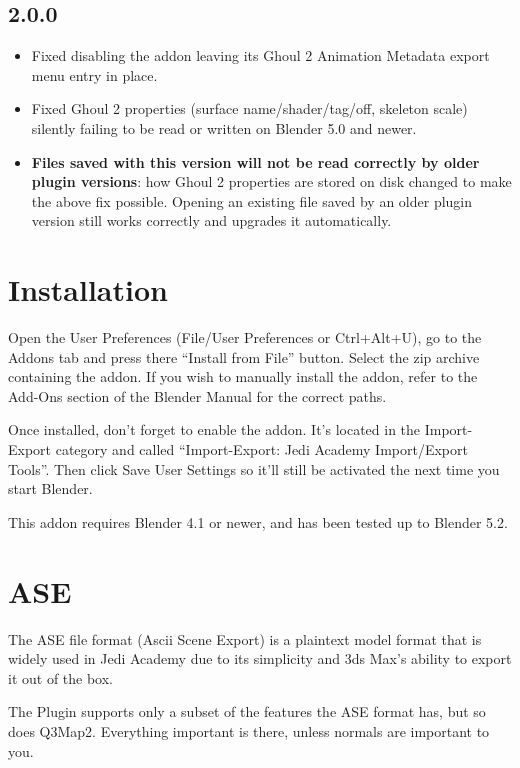 \documentclass[a4paper,10pt]{article}
\begin{document}
 \subsection*{2.0.0}
 \begin{itemize}
  \item Fixed disabling the addon leaving its Ghoul 2 Animation Metadata export menu entry in place.
  \item Fixed Ghoul 2 properties (surface name/shader/tag/off, skeleton scale) silently failing to be
  read or written on Blender 5.0 and newer.
  \item \textbf{Files saved with this version will not be read correctly by older plugin versions}: how
  Ghoul 2 properties are stored on disk changed to make the above fix possible. Opening an existing
  file saved by an older plugin version still works correctly and upgrades it automatically.
 \end{itemize}

 \section{Installation}
 
 Open the User Preferences (File/User Preferences or Ctrl+Alt+U), go to the Addons tab and press there
 ``Install from File'' button. Select the zip archive containing the addon. If you wish to manually install the
 addon, refer to the Add-Ons section of the Blender Manual for the correct paths.
 
 Once installed, don't forget to enable the addon. It's located in the Import-Export category and called
 ``Import-Export: Jedi Academy Import/Export Tools''. Then click Save User Settings so it'll still be activated
 the next time you start Blender.

 This addon requires Blender 4.1 or newer, and has been tested up to Blender 5.2.

 \section{ASE}
 
 The ASE file format (Ascii Scene Export) is a plaintext model format that is widely used in Jedi Academy due
 to its simplicity and 3ds Max's ability to export it out of the box.
 
 The Plugin supports only a subset of the features the ASE format has, but so does Q3Map2. Everything important
 is there, unless normals are important to you.
 
\end{document}
